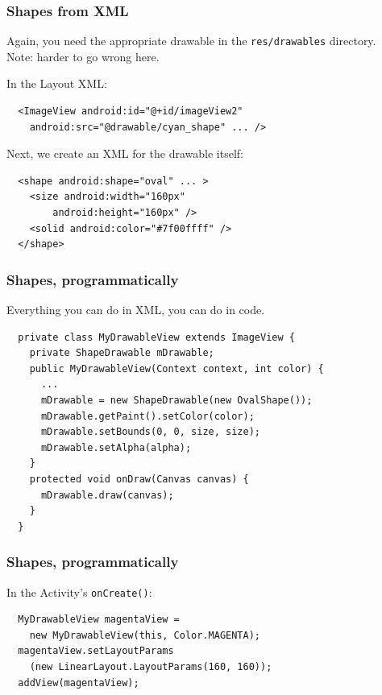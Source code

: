\begin{frame}[fragile]
\frametitle{Shapes from XML}

\begin{changemargin}{1cm}
Again, you need the appropriate drawable in the {\tt res/drawables} directory.\\[1em]
Note: harder to go wrong here.

In the Layout XML:
\begin{verbatim}
  <ImageView android:id="@+id/imageView2"
    android:src="@drawable/cyan_shape" ... />
\end{verbatim}

Next, we create an XML for the drawable itself:
\begin{verbatim}
  <shape android:shape="oval" ... >
    <size android:width="160px" 
    	android:height="160px" />
    <solid android:color="#7f00ffff" />
  </shape>
\end{verbatim}

\end{changemargin}
\end{frame}

\begin{frame}[fragile]
\frametitle{Shapes, programmatically}
\begin{changemargin}{1cm}
Everything you can do in XML, you can do in code.

{\scriptsize
\begin{verbatim}
  private class MyDrawableView extends ImageView {
    private ShapeDrawable mDrawable;
    public MyDrawableView(Context context, int color) {
      ...
      mDrawable = new ShapeDrawable(new OvalShape());
      mDrawable.getPaint().setColor(color);
      mDrawable.setBounds(0, 0, size, size);
      mDrawable.setAlpha(alpha);
    }
    protected void onDraw(Canvas canvas) {
      mDrawable.draw(canvas);
    }
  }
\end{verbatim}
}

\end{changemargin}
\end{frame}

\begin{frame}[fragile]
\frametitle{Shapes, programmatically}
\begin{changemargin}{1cm}
In the Activity's {\tt onCreate()}:
\begin{verbatim}
  MyDrawableView magentaView = 
    new MyDrawableView(this, Color.MAGENTA);
  magentaView.setLayoutParams
    (new LinearLayout.LayoutParams(160, 160));
  addView(magentaView);
\end{verbatim}
\end{changemargin}
\end{frame}

